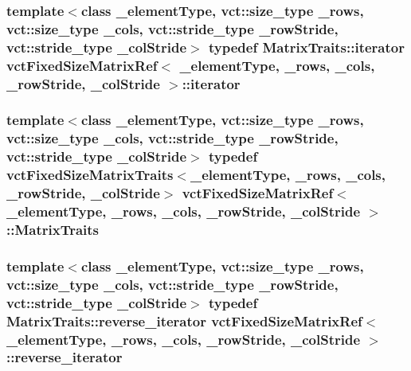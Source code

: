 \hypertarget{classvct_fixed_size_matrix_ref_ab9d9f2e3e1370846c2da44b10e4ad9f8}{
\subsubsection[{iterator}]{\setlength{\rightskip}{0pt plus 5cm}template$<$class \-\_\-element\-Type, vct\-::size\-\_\-type \-\_\-rows, vct\-::size\-\_\-type \-\_\-cols, vct\-::stride\-\_\-type \-\_\-row\-Stride, vct\-::stride\-\_\-type \-\_\-col\-Stride$>$ typedef {\bf Matrix\-Traits\-::iterator} {\bf vct\-Fixed\-Size\-Matrix\-Ref}$<$ \-\_\-element\-Type, \-\_\-rows, \-\_\-cols, \-\_\-row\-Stride, \-\_\-col\-Stride $>$\-::{\bf iterator}}}\label{classvct_fixed_size_matrix_ref_ab9d9f2e3e1370846c2da44b10e4ad9f8}
\hypertarget{classvct_fixed_size_matrix_ref_a9716291cd710aec62841490659e783da}{
\subsubsection[{Matrix\-Traits}]{\setlength{\rightskip}{0pt plus 5cm}template$<$class \-\_\-element\-Type, vct\-::size\-\_\-type \-\_\-rows, vct\-::size\-\_\-type \-\_\-cols, vct\-::stride\-\_\-type \-\_\-row\-Stride, vct\-::stride\-\_\-type \-\_\-col\-Stride$>$ typedef {\bf vct\-Fixed\-Size\-Matrix\-Traits}$<$\-\_\-element\-Type, \-\_\-rows, \-\_\-cols, \-\_\-row\-Stride, \-\_\-col\-Stride$>$ {\bf vct\-Fixed\-Size\-Matrix\-Ref}$<$ \-\_\-element\-Type, \-\_\-rows, \-\_\-cols, \-\_\-row\-Stride, \-\_\-col\-Stride $>$\-::{\bf Matrix\-Traits}}}\label{classvct_fixed_size_matrix_ref_a9716291cd710aec62841490659e783da}
\hypertarget{classvct_fixed_size_matrix_ref_a052eeff62ac55a54af1179c7fd8d246f}{
\subsubsection[{reverse\-\_\-iterator}]{\setlength{\rightskip}{0pt plus 5cm}template$<$class \-\_\-element\-Type, vct\-::size\-\_\-type \-\_\-rows, vct\-::size\-\_\-type \-\_\-cols, vct\-::stride\-\_\-type \-\_\-row\-Stride, vct\-::stride\-\_\-type \-\_\-col\-Stride$>$ typedef {\bf Matrix\-Traits\-::reverse\-\_\-iterator} {\bf vct\-Fixed\-Size\-Matrix\-Ref}$<$ \-\_\-element\-Type, \-\_\-rows, \-\_\-cols, \-\_\-row\-Stride, \-\_\-col\-Stride $>$\-::{\bf reverse\-\_\-iterator}}}\label{classvct_fixed_size_matrix_ref_a052eeff62ac55a54af1179c7fd8d246f}
